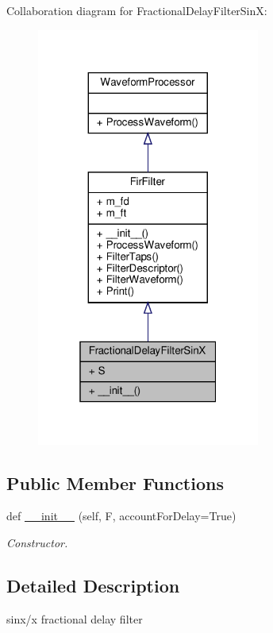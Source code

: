 Collaboration diagram for Fractional\+Delay\+Filter\+SinX\+:\nopagebreak
\begin{figure}[H]
\begin{center}
\leavevmode
\includegraphics[width=208pt]{classSignalIntegrity_1_1TimeDomain_1_1Filters_1_1InterpolatorSinX_1_1FractionalDelayFilterSinX__coll__graph}
\end{center}
\end{figure}
\subsection*{Public Member Functions}
\begin{DoxyCompactItemize}
\item 
def \hyperlink{classSignalIntegrity_1_1TimeDomain_1_1Filters_1_1InterpolatorSinX_1_1FractionalDelayFilterSinX_a71162faa904c7ea2018b89ebba16c33d}{\+\_\+\+\_\+init\+\_\+\+\_\+} (self, F, account\+For\+Delay=True)
\begin{DoxyCompactList}\small\item\em Constructor. \end{DoxyCompactList}\end{DoxyCompactItemize}


\subsection{Detailed Description}
sinx/x fractional delay filter 

